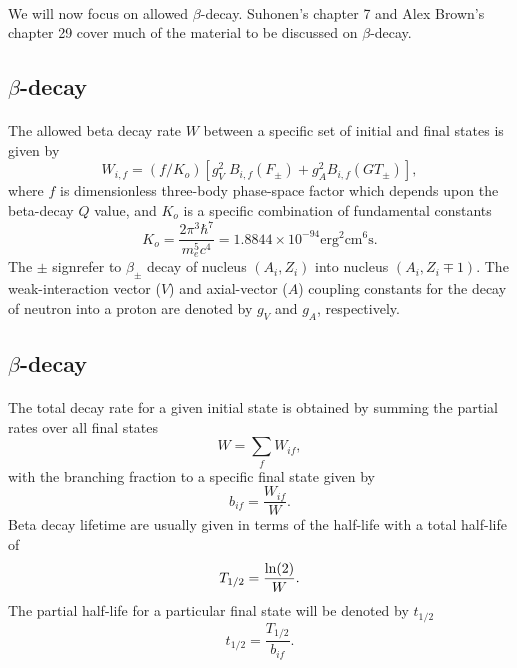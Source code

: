 \documentclass[%
twoside,                 %
final,                   %
10pt]{article}
\begin{document}
\paragraph{}
We will now focus on  allowed $\beta$-decay.  
Suhonen's chapter 7 and Alex Brown's chapter 29 cover much of the material to be discussed on $\beta$-decay.



\subsection*{$\beta$-decay}

\paragraph{}
The allowed beta decay rate $W$ between a specific set of
initial and final states is given by
\[
W_{i,f} = (f/K_{o}) \left[ g_{V}^{2} \; B_{i,f}(F_{\pm})+ g_{A}^{2}B_{i,f}(GT_{\pm})\right], 
\]
where $f$ is dimensionless three-body
phase-space factor which depends upon the
beta-decay $Q$ value,
and $K_{o}$ is a specific combination of fundamental constants
\[
  K_{o}=\frac{2\pi^{3}\hbar^{7}}{ m_{e}^{5} c^{4}}= 1.8844 \times 10^{-94}\mathrm{erg}^{2}\mathrm{cm}^{6}\mathrm{s}. 
\]
The $\pm$ signrefer to $\beta_{\pm}$ decay of nucleus
$(A_{i},Z_{i})$ into nucleus $(A_{i},Z_{i} \mp 1)  $.
The weak-interaction vector ($V$) and axial-vector ($A$) coupling
constants for the decay of neutron into a proton are denoted by $g_{V}$
and $g_{A}$, respectively.



\subsection*{$\beta$-decay}

\paragraph{}
The total decay rate for a given
initial state is obtained by summing the partial rates over all
final states
\[
W = \displaystyle\sum _{f} W_{if}, 
\]
with the branching fraction to a specific final state given by
\[
b_{if} = \frac{W_{if}}{W}.  
\]
Beta decay lifetime are usually given in terms of the half-life with
a total half-life of
\[
T_{1/2} = \frac{{\rm ln}(2)}{W}.
\]
The partial half-life for a particular final state will be
denoted by $  t_{1/2}  $
\[
t_{1/2} = \frac{T_{1/2}}{b_{if}}. 
\]
\end{document}
